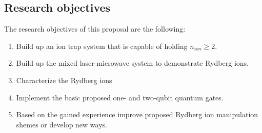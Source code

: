 \subsection{Research objectives}
The research objectives of this proposal are the following:
\begin{enumerate}
 \item Build up an ion trap system that is capable of holding $n_{ion} \ge 2$.
 \item Build up the mixed laser-microwave system to demonstrate Rydberg ions.
 \item Characterize the Rydberg ions
 \item Implement the basic proposed one- and two-qubit quantum gates.
 \item Based on the gained experience improve proposed Rydberg ion manipulation shemes or develop new ways.
\end{enumerate}







